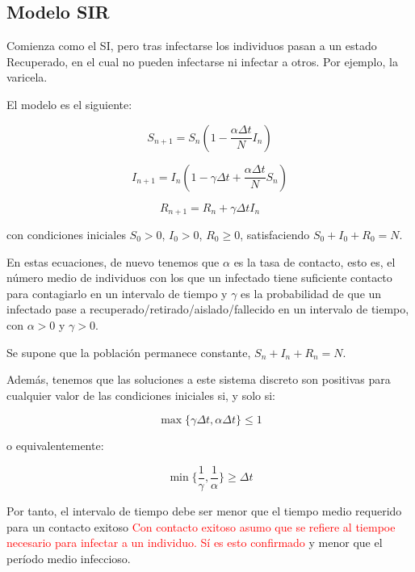  

\subsection{Modelo SIR}
Comienza como el SI, pero tras infectarse los individuos pasan a un estado Recuperado, en el cual no pueden infectarse ni infectar a otros.
Por ejemplo, la varicela. 

El modelo es el siguiente:

\begin{equation}
\label{eqn: SIR_modelo_S}
S_{n+1} = S_n \left(1-\frac{\alpha\Delta t}{N} I_n \right)
\end{equation}

\begin{equation}
\label{eqn: SIR_modelo_I}
I_{n+1} = I_n \left( 1-\gamma \Delta t + \frac{\alpha\Delta t}{N} S_n \right)
\end{equation}

\begin{equation}
\label{eqn: SIR_modelo_R}
R_{n+1} = R_n + \gamma \Delta t I_n
\end{equation}

con condiciones iniciales $S_0>0$, $I_0>0$, $R_0\geq 0$, satisfaciendo $S_0+I_0+R_0=N$.

En estas ecuaciones, de nuevo tenemos que $\alpha$ es la tasa de contacto, esto es, el número medio de individuos con los que un infectado tiene suficiente contacto para contagiarlo en un intervalo de tiempo y $\gamma$ es la probabilidad de que un infectado pase a recuperado/retirado/aislado/fallecido en un intervalo de tiempo, con $\alpha >0$ y $\gamma >0$.

Se supone que la población permanece constante, $S_n+I_n+R_n=N$.

Además, tenemos que las soluciones a este sistema discreto son positivas para cualquier valor de las condiciones iniciales si, y solo si:

$$\max{\big\{\gamma\Delta t, \alpha\Delta t\big\} } \leq 1$$

o equivalentemente:

$$\min{\bigg\{ \frac{1}{\gamma}, \frac{1}{\alpha} \bigg\} } \geq \Delta t$$

Por tanto, el intervalo de tiempo debe ser menor que el tiempo medio requerido para un contacto exitoso \textcolor{red}{Con contacto exitoso asumo que se refiere al tiempoe necesario para infectar a un individuo. Sí es esto confirmado} y menor que el período medio infeccioso.


